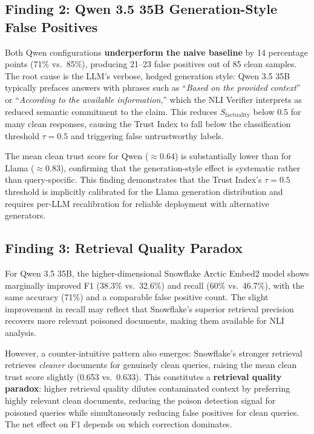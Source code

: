 \subsection{Finding 2: Qwen 3.5 35B Generation-Style False Positives}

Both Qwen configurations \textbf{underperform the naive baseline} by 14 percentage
points (71\% vs.\ 85\%), producing 21--23 false positives out of 85 clean samples.
The root cause is the LLM's verbose, hedged generation style: Qwen 3.5 35B typically
prefaces answers with phrases such as ``\textit{Based on the provided context}'' or
``\textit{According to the available information},'' which the NLI Verifier interprets as
reduced semantic commitment to the claim. This reduces $S_{\text{factuality}}$ below 0.5
for many clean responses, causing the Trust Index to fall below the classification
threshold $\tau = 0.5$ and triggering false untrustworthy labels.

The mean clean trust score for Qwen ($\approx 0.64$) is substantially lower than for
Llama ($\approx 0.83$), confirming that the generation-style effect is systematic rather
than query-specific. This finding demonstrates that the Trust Index's $\tau = 0.5$
threshold is implicitly calibrated for the Llama generation distribution and requires
per-LLM recalibration for reliable deployment with alternative generators.

\subsection{Finding 3: Retrieval Quality Paradox}

For Qwen 3.5 35B, the higher-dimensional Snowflake Arctic Embed2 model shows marginally
improved F1 (38.3\% vs.\ 32.6\%) and recall (60\% vs.\ 46.7\%), with the same accuracy
(71\%) and a comparable false positive count. The slight improvement in recall may reflect
that Snowflake's superior retrieval precision recovers more relevant poisoned documents,
making them available for NLI analysis.

However, a counter-intuitive pattern also emerges: Snowflake's stronger retrieval retrieves
\textit{cleaner} documents for genuinely clean queries, raising the mean clean trust score
slightly (0.653 vs.\ 0.633). This constitutes a \textbf{retrieval quality paradox}: higher
retrieval quality dilutes contaminated context by preferring highly relevant clean documents,
reducing the poison detection signal for poisoned queries while simultaneously reducing
false positives for clean queries. The net effect on F1 depends on which correction
dominates.

